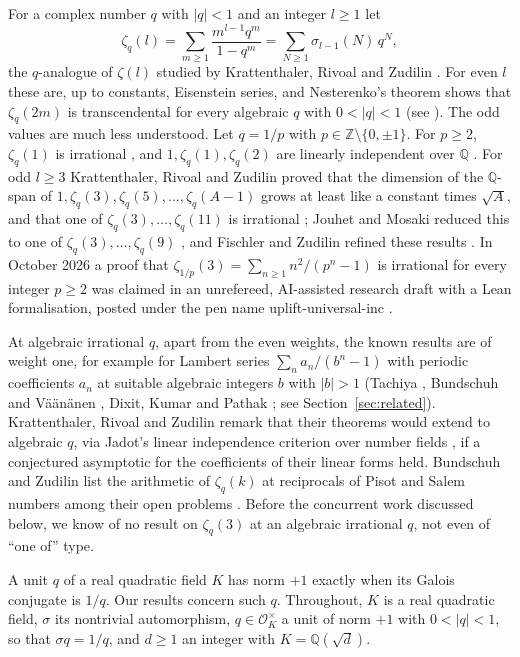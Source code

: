 \documentclass[11pt]{amsart}
\theoremstyle{definition}
\theoremstyle{remark}
\numberwithin{equation}{section}
\newcommand{\ZZ}{\mathbb{Z}}
\newcommand{\QQ}{\mathbb{Q}}
\newcommand{\cO}{\mathcal{O}}
\begin{document}
For a complex number $q$ with $|q|<1$ and an integer $l\ge1$ let
\[
\zeta_q(l)=\sum_{m\ge1}\frac{m^{l-1}q^m}{1-q^m}=\sum_{N\ge1}\sigma_{l-1}(N)\,q^N,
\]
the $q$-analogue of $\zeta(l)$ studied by Krattenthaler, Rivoal and Zudilin \cite{KRZ06}. For even $l$ these are, up to
constants, Eisenstein series, and Nesterenko's theorem \cite{Nes96} shows that $\zeta_q(2m)$ is transcendental for
every algebraic $q$ with $0<|q|<1$ (see \cite[Introduction]{JM10}). The odd values are much less understood. Let
$q=1/p$ with $p\in\ZZ\setminus\{0,\pm1\}$. For $p\ge2$, $\zeta_q(1)$ is irrational \cite{Bor92}, and
$1,\zeta_q(1),\zeta_q(2)$ are linearly independent over $\QQ$ \cite{PVA07}. For odd $l\ge3$ Krattenthaler, Rivoal and
Zudilin proved that the dimension of the $\QQ$-span of $1,\zeta_q(3),\zeta_q(5),\dots,\zeta_q(A-1)$ grows at least like
a constant times $\sqrt A$, and that one of $\zeta_q(3),\dots,\zeta_q(11)$ is irrational \cite{KRZ06}; Jouhet and
Mosaki reduced this to one of $\zeta_q(3),\dots,\zeta_q(9)$ \cite{JM10}, and Fischler and Zudilin refined these results
\cite{FZ10}. In October 2026 a proof that $\zeta_{1/p}(3)=\sum_{n\ge1}n^2/(p^n-1)$ is irrational for every integer
$p\ge2$ was claimed in an unrefereed, AI-assisted research draft with a Lean formalisation, posted under the pen name
uplift-universal-inc \cite{UPL,QZ3}.

At algebraic irrational $q$, apart from the even weights, the known results are of weight one, for example for Lambert
series $\sum_na_n/(b^n-1)$ with periodic coefficients $a_n$ at suitable algebraic integers $b$ with $|b|>1$ (Tachiya
\cite{Tac04}, Bundschuh and V\"a\"an\"anen \cite{BV05}, Dixit, Kumar and Pathak \cite{DKP24}; see
Section~\ref{sec:related}). Krattenthaler, Rivoal and Zudilin remark \cite[\S3.5]{KRZ06} that their theorems would extend to algebraic
$q$, via Jadot's linear independence criterion over number fields \cite{Jad96}, if a conjectured asymptotic for the
coefficients of their linear forms held. Bundschuh and Zudilin list the arithmetic of $\zeta_q(k)$ at reciprocals of
Pisot and Salem numbers among their open problems \cite[\S6]{BZ07}. Before the concurrent work discussed below, we know
of no result on $\zeta_q(3)$ at an algebraic irrational $q$, not even of ``one of'' type.

A unit $q$ of a real quadratic field $K$ has norm $+1$ exactly when its Galois conjugate is $1/q$. Our results concern
such $q$. Throughout, $K$ is a real quadratic field, $\sigma$ its nontrivial automorphism, $q\in\cO_K^\times$ a unit of
norm $+1$ with $0<|q|<1$, so that $\sigma q=1/q$, and $d\ge1$ an integer with $K=\QQ(\sqrt d)$.
\end{document}

